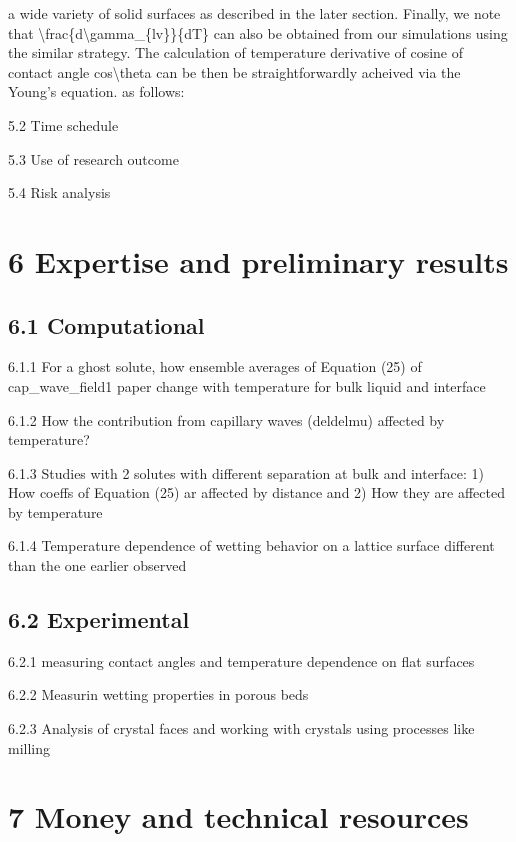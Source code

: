 a wide variety of solid surfaces as described in the later section. Finally, we note that \textbackslash frac\{d\textbackslash gamma\_\{lv\}\}\{dT\} can also be obtained from our simulations using the similar strategy. The calculation of temperature derivative of cosine of contact angle cos\textbackslash theta can be then be straightforwardly acheived via the Young's equation. as follows:
\par 5.2 Time schedule
\par 5.3 Use of research outcome
\par 5.4 Risk analysis\section{6 Expertise and preliminary results}
\subsection{6.1 Computational}

\par 6.1.1 For a ghost solute, how ensemble averages of Equation (25) of cap\_wave\_field1 paper change with temperature for bulk liquid and interface
\par 6.1.2 How the contribution from capillary waves (deldelmu) affected by temperature?
\par 6.1.3 Studies with 2 solutes with different separation at bulk and interface: 1) How coeffs of Equation (25) ar affected by distance and 2) How they are affected by temperature
\par 6.1.4 Temperature dependence of wetting behavior on a lattice surface different than the one earlier observed\subsection{6.2 Experimental}

\par 6.2.1 measuring contact angles and temperature dependence on flat surfaces
\par 6.2.2 Measurin wetting properties in porous beds
\par 6.2.3 Analysis of crystal faces and working with crystals using processes like milling\section{7 Money and technical resources}
